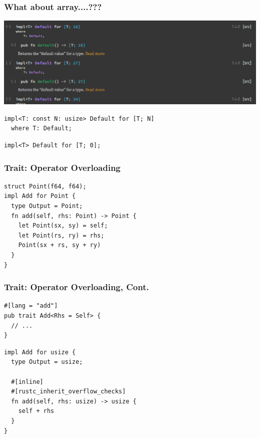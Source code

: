 \documentclass[UTF-8]{ctexbeamer}
\begin{document}
\begin{frame}[fragile]
  \frametitle{What about array....???}

  \includegraphics[width=\textwidth]{assets/array-bad.png}

  \pause
  \vspace{1em}

  \begin{verbatim}
impl<T: const N: usize> Default for [T; N]
  where T: Default;
  \end{verbatim}

  \pause

  \begin{verbatim}
impl<T> Default for [T; 0];
  \end{verbatim}
\end{frame}

\begin{frame}[fragile]
  \frametitle{Trait: Operator Overloading}

  \pause

  \begin{verbatim}
struct Point(f64, f64);
impl Add for Point {
  type Output = Point;
  fn add(self, rhs: Point) -> Point {
    let Point(sx, sy) = self;
    let Point(rs, ry) = rhs;
    Point(sx + rs, sy + ry)
  }
}
  \end{verbatim}
\end{frame}

\begin{frame}[fragile]
  \frametitle{Trait: Operator Overloading, Cont.}
  \begin{verbatim}
#[lang = "add"]
pub trait Add<Rhs = Self> {
  // ...
}
  \end{verbatim}
  \pause

  \begin{verbatim}
impl Add for usize {
  type Output = usize;

  #[inline]
  #[rustc_inherit_overflow_checks]
  fn add(self, rhs: usize) -> usize {
    self + rhs
  }
}
  \end{verbatim}
\end{frame}
\end{document}
